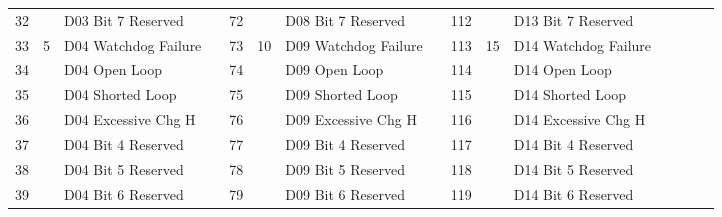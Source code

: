 \documentclass[]{article}
\begin{document}
\begin{landscape}
\begin{table}[]
\begin{tabular}{lllllllllllllll}
			32           &                    & D03 Bit 7 Reserved            &                   & 72           &                     & D08 Bit 7 Reserved   &  & 112          &                     & D13 Bit 7 Reserved   &  &                   &                     &                      \\ \cline{1-3} \cline{5-7} \cline{9-11}
			33           & \multirow{8}{*}{5} & D04 Watchdog Failure          &                   & 73           & \multirow{8}{*}{10} & D09 Watchdog Failure &  & 113          & \multirow{8}{*}{15} & D14 Watchdog Failure &  & \multirow{4}{*}{} &                     &                      \\
			34           &                    & D04 Open Loop                 &                   & 74           &                     & D09 Open Loop        &  & 114          &                     & D14 Open Loop        &  &                   &                     &                      \\
			35           &                    & D04 Shorted Loop              &                   & 75           &                     & D09 Shorted Loop     &  & 115          &                     & D14 Shorted Loop     &  &                   &                     &                      \\
			36           &                    & D04 Excessive Chg H           &                   & 76           &                     & D09 Excessive Chg H  &  & 116          &                     & D14 Excessive Chg H  &  &                   &                     &                      \\
			37           &                    & D04 Bit 4 Reserved            &                   & 77           &                     & D09 Bit 4 Reserved   &  & 117          &                     & D14 Bit 4 Reserved   &  & \multirow{4}{*}{} &                     &                      \\
			38           &                    & D04 Bit 5 Reserved            &                   & 78           &                     & D09 Bit 5 Reserved   &  & 118          &                     & D14 Bit 5 Reserved   &  &                   &                     &                      \\
			39           &                    & D04 Bit 6 Reserved            &                   & 79           &                     & D09 Bit 6 Reserved   &  & 119          &                     & D14 Bit 6 Reserved   &  &                   &                     &                      \\

\end{tabular}
\end{table}
\end{landscape}
\end{document}
